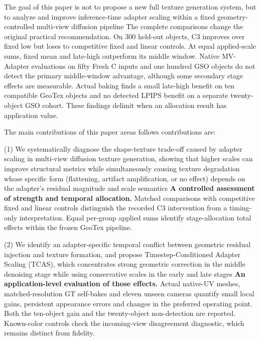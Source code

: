 \documentclass[times,twocolumn,final]{elsarticle}
\providecommand{\DIFadd}[1]{{\protect\color{blue} \sf #1}} %
\providecommand{\DIFdel}[1]{{\protect\color{red} \scriptsize #1}} %
\providecommand{\DIFaddbegin}{} %
\providecommand{\DIFaddend}{} %
\providecommand{\DIFdelbegin}{} %
\providecommand{\DIFdelend}{} %
\begin{document}
\DIFdelbegin \DIFdel{The goal of this paper is not to propose a new full texture generation system, but to analyze and improve inference-time adapter scaling within a fixed geometry-controlled multi-view diffusion pipeline}\DIFdelend \DIFaddbegin \DIFadd{The complete comparisons change the original practical recommendation. On 300 held-out objects, C3 improves over fixed low but loses to competitive fixed and linear controls. At equal applied-scale sums, fixed mean and late-high outperform its middle window. Native MV-Adapter evaluations on fifty Fresh C inputs and one hundred GSO objects do not detect the primary middle-window advantage, although some secondary stage effects are measurable. Actual baking finds a small late-high benefit on ten compatible GeoTex objects and no detected LPIPS benefit on a separate twenty-object GSO cohort. These findings delimit when an allocation result has application value}\DIFaddend .

The \DIFdelbegin \DIFdel{main contributions of this paper areas follows}\DIFdelend \DIFaddbegin \DIFadd{contributions are}\DIFaddend :

(1) \DIFdelbegin \DIFdel{We systematically diagnose the shape-texture trade-off caused by adapter scaling in multi-view diffusion texture generation, showing that higher scales can improve structural metrics while simultaneously causing texture degradation whose specific form (flattening, artifact amplification, or no effect) depends on the adapter's residual magnitude and scale semantics}\DIFdelend \DIFaddbegin \DIFadd{\textbf{A controlled assessment of strength and temporal allocation.} Matched comparisons with competitive fixed and linear controls distinguish the recorded C3 intervention from a timing-only interpretation. Equal per-group applied sums identify stage-allocation total effects within the frozen GeoTex pipeline}\DIFaddend .

(2) \DIFdelbegin \DIFdel{We identify an adapter-specific temporal conflict between geometric residual injection and texture formation, and propose Timestep-Conditioned Adapter Scaling (TCAS), which concentrates strong geometric correction in the middle denoising stage while using conservative scales in the early and late stages}\DIFdelend \DIFaddbegin \DIFadd{\textbf{An application-level evaluation of those effects.} Actual native-UV meshes, matched-resolution GT self-bakes and eleven unseen cameras quantify small local gains, persistent appearance errors and changes in the preferred operating point. Both the ten-object gain and the twenty-object non-detection are reported. Known-color controls check the incoming-view disagreement diagnostic, which remains distinct from fidelity}\DIFaddend .
\end{document}
